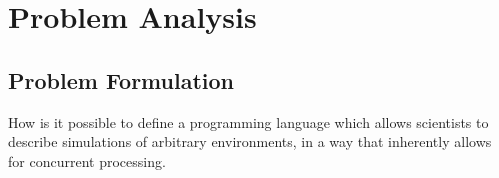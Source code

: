 \chapter{Problem Analysis}
\section{Problem Formulation}
How is it possible to define a programming language which allows scientists to describe simulations of arbitrary environments, in a way that inherently allows for concurrent processing.